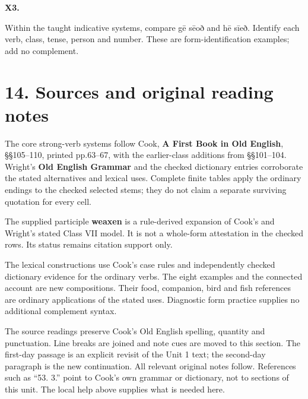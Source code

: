 \par\begin{minipage}{\linewidth}\raggedright
\textbf{X3.}

Within the taught indicative systems, compare gē sēoð and hē sīeð. Identify each verb, class, tense, person and number. These are form-identification examples; add no complement.

\end{minipage}\par\addvspace{4pt}

\clearpage
\section*{14. Sources and original reading notes}

\begingroup\fontsize{10}{12.8}\selectfont
\setlength{\parskip}{1.5pt}
The core strong-verb systems follow Cook, \textbf{A First Book in Old English}, §§105–110, printed pp.63–67, with the earlier-class additions from §§101–104. Wright’s \textbf{Old English Grammar} and the checked dictionary entries corroborate the stated alternatives and lexical uses. Complete finite tables apply the ordinary endings to the checked selected stems; they do not claim a separate surviving quotation for every cell.

The supplied participle \textbf{weaxen} is a rule-derived expansion of Cook’s and Wright’s stated Class VII model. It is not a whole-form attestation in the checked rows. Its status remains citation support only.

The lexical constructions use Cook’s case rules and independently checked dictionary evidence for the ordinary verbs. The eight examples and the connected account are new compositions. Their food, companion, bird and fish references are ordinary applications of the stated uses. Diagnostic form practice supplies no additional complement syntax.

The source readings preserve Cook’s Old English spelling, quantity and punctuation. Line breaks are joined and note cues are moved to this section. The first-day passage is an explicit revisit of the Unit 1 text; the second-day paragraph is the new continuation. All relevant original notes follow. References such as “53. 3.” point to Cook’s own grammar or dictionary, not to sections of this unit. The local help above supplies what is needed here.

